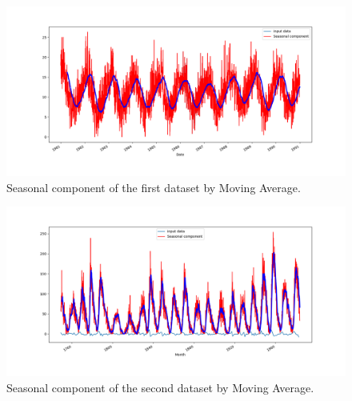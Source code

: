 \begin{figure}[H]
    \centering
    \begin{minipage}[b]{1\textwidth}
        \includegraphics[width=\textwidth]{figures/Ass1/Ass1_D1_Moving_Avrage.png}
    \end{minipage}
    \caption{Seasonal component of the first dataset by Moving Average.}
    \label{fig:Ass1_D1_Moving_Avrage}
\end{figure}

\begin{figure}[H]
    \centering
    \begin{minipage}[b]{1\textwidth}
        \includegraphics[width=\textwidth]{figures/Ass1/Ass1_D2_Moving_Avrage.png}
    \end{minipage}
    \caption{Seasonal component of the second dataset by Moving Average.}
    \label{fig:Ass1_D2_Moving_Avrage}
\end{figure}
